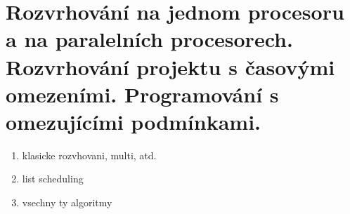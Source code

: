 \section[KO - Scheduling]{Rozvrhování na jednom procesoru a na paralelních procesorech. Rozvrhování projektu s časovými omezeními. Programování s omezujícími podmínkami.}

\begin{enumerate}
\item klasicke rozvhovani, multi, atd.\item list scheduling\item vsechny ty algoritmy
\end{enumerate}